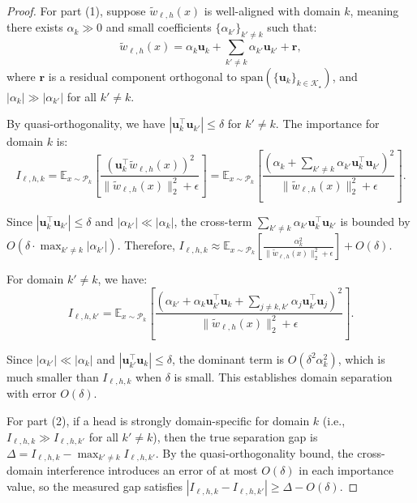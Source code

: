 \begin{proof}
For part (1), suppose $\tilde{w}_{\ell,h}(x)$ is well-aligned with domain $k$, meaning there exists $\alpha_k \gg 0$ and small coefficients $\{\alpha_{k'}\}_{k' \neq k}$ such that:
\begin{equation}
\tilde{w}_{\ell,h}(x) = \alpha_k \mathbf{u}_k + \sum_{k' \neq k} \alpha_{k'} \mathbf{u}_{k'} + \mathbf{r},
\end{equation}
where $\mathbf{r}$ is a residual component orthogonal to $\mathrm{span}(\{\mathbf{u}_k\}_{k \in \mathcal{K}_\star})$, and $|\alpha_k| \gg |\alpha_{k'}|$ for all $k' \neq k$.

By quasi-orthogonality, we have $|\mathbf{u}_k^\top \mathbf{u}_{k'}| \leq \delta$ for $k' \neq k$.
The importance for domain $k$ is:
\begin{equation}
I_{\ell,h,k} = \mathbb{E}_{x \sim \mathcal{P}_k}\left[\frac{(\mathbf{u}_k^\top \tilde{w}_{\ell,h}(x))^2}{\|\tilde{w}_{\ell,h}(x)\|_2^2 + \epsilon}\right] = \mathbb{E}_{x \sim \mathcal{P}_k}\left[\frac{(\alpha_k + \sum_{k' \neq k} \alpha_{k'} \mathbf{u}_k^\top \mathbf{u}_{k'})^2}{\|\tilde{w}_{\ell,h}(x)\|_2^2 + \epsilon}\right].
\end{equation}

Since $|\mathbf{u}_k^\top \mathbf{u}_{k'}| \leq \delta$ and $|\alpha_{k'}| \ll |\alpha_k|$, the cross-term $\sum_{k' \neq k} \alpha_{k'} \mathbf{u}_k^\top \mathbf{u}_{k'}$ is bounded by $O(\delta \cdot \max_{k' \neq k} |\alpha_{k'}|)$.
Therefore, $I_{\ell,h,k} \approx \mathbb{E}_{x \sim \mathcal{P}_k}[\frac{\alpha_k^2}{\|\tilde{w}_{\ell,h}(x)\|_2^2 + \epsilon}] + O(\delta)$.

For domain $k' \neq k$, we have:
\begin{equation}
I_{\ell,h,k'} = \mathbb{E}_{x \sim \mathcal{P}_k}\left[\frac{(\alpha_{k'} + \alpha_k \mathbf{u}_{k'}^\top \mathbf{u}_k + \sum_{j \neq k,k'} \alpha_j \mathbf{u}_{k'}^\top \mathbf{u}_j)^2}{\|\tilde{w}_{\ell,h}(x)\|_2^2 + \epsilon}\right].
\end{equation}

Since $|\alpha_{k'}| \ll |\alpha_k|$ and $|\mathbf{u}_{k'}^\top \mathbf{u}_k| \leq \delta$, the dominant term is $O(\delta^2 \alpha_k^2)$, which is much smaller than $I_{\ell,h,k}$ when $\delta$ is small.
This establishes domain separation with error $O(\delta)$.

For part (2), if a head is strongly domain-specific for domain $k$ (i.e., $I_{\ell,h,k} \gg I_{\ell,h,k'}$ for all $k' \neq k$), then the true separation gap is $\Delta = I_{\ell,h,k} - \max_{k' \neq k} I_{\ell,h,k'}$.
By the quasi-orthogonality bound, the cross-domain interference introduces an error of at most $O(\delta)$ in each importance value, so the measured gap satisfies $|I_{\ell,h,k} - I_{\ell,h,k'}| \geq \Delta - O(\delta)$.
\end{proof}


